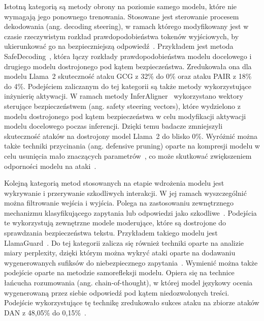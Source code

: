 Istotną kategorią są metody obrony na poziomie samego modelu, które nie wymagają jego ponownego trenowania. Stosowane jest sterowanie procesem dekodowania (ang. decoding steering), w ramach którego modyfikowany jest w czasie rzeczywistym rozkład prawdopodobieństwa tokenów wyjściowych, by ukierunkować go na bezpieczniejszą odpowiedź~\cite{correia2026systematicliteraturereviewllm}.
Przykładem jest metoda SafeDecoding~\cite{xu2024safedecodingdefendingjailbreakattacks}, która łączy rozkłady prawdopodobieństwa modelu docelowego i drugiego modelu dostrojonego pod kątem bezpieczeństwa. Zredukowała ona dla modelu Llama~2 skuteczność ataku GCG z 32\% do 0\% oraz ataku PAIR z 18\% do 4\%.
Podejściem zaliczanym do tej kategorii są także metody wykorzystujące inżynierię aktywacji. W ramach metody InferAligner~\cite{wang2024inferalignerinferencetimealignmentharmlessness} wykorzystano wektory sterujące bezpieczeństwem (ang. safety steering vectors), które wydzielono z modelu dostrojonego pod kątem bezpieczeństwa w celu modyfikacji aktywacji modelu docelowego poczas inferencji. Dzięki temu badacze zmniejszyli skuteczność ataków na dostrojony model Llama~2 do blisko 0\%.
Wyróżnić można także techniki przycinania (ang. defensive pruning) oparte na kompresji modelu w celu usunięcia mało znaczących parametrów~\cite{correia2026systematicliteraturereviewllm}, co może skutkować zwiększeniem odporności modelu na ataki~\cite{hasan2024pruningprotectionincreasingjailbreak}.

Kolejną kategorią metod stosowanych na etapie wdrożenia modelu jest wykrywanie i przerywanie szkodliwych interakcji. W jej ramach wyszczególnić można filtrowanie wejścia i wyjścia. Polega na zastosowaniu zewnętrznego mechanizmu klasyfikującego zapytania lub odpowiedzi jako szkodliwe~\cite{correia2026systematicliteraturereviewllm}. Podejścia te wykorzystują zewnętrzne modele moderujące, które są dostrojone do sprawdzania bezpieczeństwa tekstu. Przykładem takiego modelu jest LlamaGuard~\cite{inan2023llamaguardllmbasedinputoutput}.
Do tej kategorii zalicza się również techniki oparte na analizie miary perplexity, dzięki którym można wykryć ataki oparte na dodawaniu wygenerowanych sufiksów do niebezpiecznego zapytania~\cite{alon2023detectinglanguagemodelattacks}.
Wymienić można także podejście oparte na metodzie samorefleksji modelu. Opiera się na technice łańcucha rozumowania (ang. chain-of-thought), w której model językowy ocenia wygenerowaną przez siebie odpowiedź pod kątem niedozwolonych treści. Podejście wykorzystujące tę technikę zredukowało sukces ataku na zbiorze ataków DAN z 48,05\% do 0,15\%~\cite{cao2024chainofthought}.

